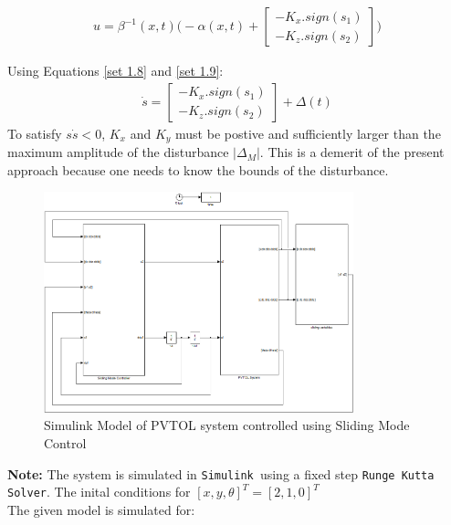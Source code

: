 \documentclass{article}
\begin{document}
\begin{align}
u=\beta^{-1}(x,t)\Big(-\alpha(x,t)+\left[\begin{array}{cc}-K_x.sign(s_1)\\-K_z.sign(s_2)\end{array}\right]\Big) 
\label{set 1.9}
\end{align}

Using Equations \ref{set 1.8} and \ref{set 1.9}:
\begin{align}
\dot{s}=\left[\begin{array}{cc}-K_x.sign(s_1)\\-K_z.sign(s_2)\end{array}\right]+\Delta(t)
\label{set 1.10}
\end{align}
To satisfy $s\dot{s}<0$, $K_x$ and $K_y$ must be postive and sufficiently larger than the maximum amplitude of the disturbance $|\Delta_M|$. This is a demerit of the present approach because one needs to know the bounds of the disturbance. \\
\begin{figure}[H]
\centering
\includegraphics[width = 0.8\textwidth]{Figures/figure2.png}
\caption{Simulink Model of PVTOL system controlled using Sliding Mode Control }
\label{fig:figure2}
\end{figure}
\textbf{Note:} The system is simulated in \texttt{Simulink  }using a fixed step \texttt{Runge Kutta Solver}. The inital conditions for $[x,y,\theta]^T=[2,1,0]^T$\\
The given model is simulated for:
\end{document}
